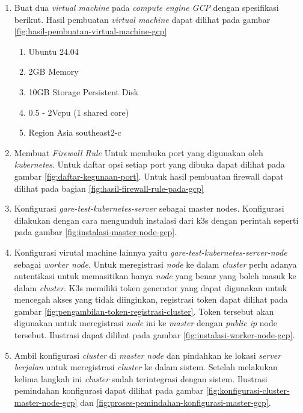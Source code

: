 \begin{enumerate}
  \item Buat dua \textit{virtual machine} pada \textit{compute engine GCP} dengan spesifikasi berikut. Hasil pembuatan \textit{virtual machine} dapat dilihat pada gambar \ref{fig:hasil-pembuatan-virtual-machine-gcp}
        \begin{enumerate}
          \item Ubuntu 24.04
          \item 2GB Memory
          \item 10GB Storage Persistent Disk
          \item 0.5 - 2Vcpu (1 shared core)
          \item Region Asia southeast2-c
        \end{enumerate}
  \item Membuat \textit{Firewall Rule} Untuk membuka port yang digunakan oleh \textit{kubernetes}. Untuk daftar opsi setiap port yang dibuka dapat dilihat pada gambar \ref{fig:daftar-kegunaan-port}. Untuk hasil pembuatan firewall dapat dilihat pada bagian \ref{fig:hasil-firewall-rule-pada-gcp}
  \item Konfigurasi \textit{gare-test-kubernetes-server} sebagai master nodes. Konfigurasi dilakukan dengan cara mengunduh instalasi dari k3s dengan perintah seperti pada gambar \ref{fig:instalasi-master-node-gcp}.
  \item Konfigurasi virutal machine lainnya yaitu \textit{gare-test-kubernetes-server-node} sebagai \textit{worker node}. Untuk meregistrasi \textit{node} ke dalam \textit{cluster} perlu adanya autentikasi untuk memasitikan hanya \textit{node} yang benar yang boleh masuk ke dalam \textit{cluster}. K3s memiliki token generator yang dapat digunakan untuk mencegah akses yang tidak diinginkan, registrasi token dapat dilihat pada gambar \ref{fig:pengambilan-token-registrasi-cluster}. Token tersebut akan digunakan untuk meregistrasi \textit{node} ini ke \textit{master} dengan \textit{public ip} node tersebut. Ilustrasi dapat dilihat pada gambar \ref{fig:instalasi-worker-node-gcp}.
  \item Ambil konfigurasi \textit{cluster} di \textit{master node} dan pindahkan ke lokasi \textit{server berjalan} untuk meregistrasi \textit{cluster} ke dalam sistem. Setelah melakukan kelima langkah ini \textit{cluster} sudah terintegrasi dengan sistem. Ilustrasi pemindahan konfigurasi dapat dilihat pada gambar \ref{fig:konfigurasi-cluster-master-node-gcp} dan \ref{fig:proses-pemindahan-konfigurasi-master-gcp}.
\end{enumerate}

